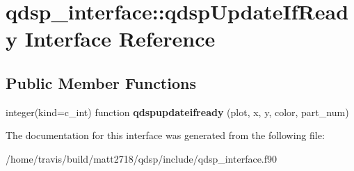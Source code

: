 \hypertarget{interfaceqdsp__interface_1_1qdspUpdateIfReady}{\section{qdsp\-\_\-interface\-:\-:qdsp\-Update\-If\-Ready Interface Reference}
\label{interfaceqdsp__interface_1_1qdspUpdateIfReady}
}
\subsection*{Public Member Functions}
\begin{DoxyCompactItemize}
\item 
\hypertarget{interfaceqdsp__interface_1_1qdspUpdateIfReady_a84fe03e0de842b92ddcde6f498e56386}{integer(kind=c\-\_\-int) function {\bfseries qdspupdateifready} (plot, x, y, color, part\-\_\-num)}\label{interfaceqdsp__interface_1_1qdspUpdateIfReady_a84fe03e0de842b92ddcde6f498e56386}

\end{DoxyCompactItemize}


The documentation for this interface was generated from the following file\-:\begin{DoxyCompactItemize}
\item 
/home/travis/build/matt2718/qdsp/include/qdsp\-\_\-interface.\-f90\end{DoxyCompactItemize}

